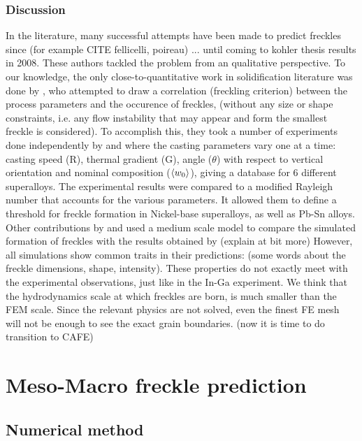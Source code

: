 \subsubsection{Discussion}
In the literature, many successful attempts have been made to predict freckles since (for example CITE fellicelli, poireau) ... 
until coming to kohler thesis results in 2008. These authors tackled the problem from an qualitative perspective. 
To our knowledge, the only close-to-quantitative work in solidification literature was done by \citet{ramirez_evaluation_2003}, 
who attempted to draw a correlation (freckling criterion) between the process parameters and the occurence of freckles, 
(without any size or shape constraints, i.e. any flow instability that may appear and form the smallest freckle is considered). 
To accomplish this, they took a number of experiments done independently by \citet{pollock_breakdown_1996} and \citet{auburtin_freckle_2000} 
where the casting parameters vary one at a time: casting speed (R), thermal gradient (G), angle ($\theta$) with respect to vertical 
orientation and nominal composition ($\langle w_0 \rangle$), giving a database for 6 different superalloys. The experimental results were 
compared to a modified Rayleigh number that accounts for the various parameters. It allowed them to define a threshold for freckle 
formation in Nickel-base superalloys, as well as Pb-Sn alloys.
Other contributions by \citet{yuan_new_2012} and  \citet{karagadde_3-d_2014} used a medium scale model to compare the simulated 
formation of freckles with the results obtained by \citet{shevchenko_chimney_2013} (explain at bit more)
However, all simulations show common traits in their predictions: (some words about the freckle dimensions, 
shape, intensity). These properties do not exactly meet with the experimental observations, just like in the 
In-Ga experiment. We think that the hydrodynamics scale at which freckles are born, is much smaller than the 
FEM scale. Since the relevant physics are not solved, even the finest FE mesh will not
be enough to see the exact grain boundaries. (now it is time to do transition to CAFE)
%
\section{Meso-Macro freckle prediction}
%
\subsection{Numerical method}
%
